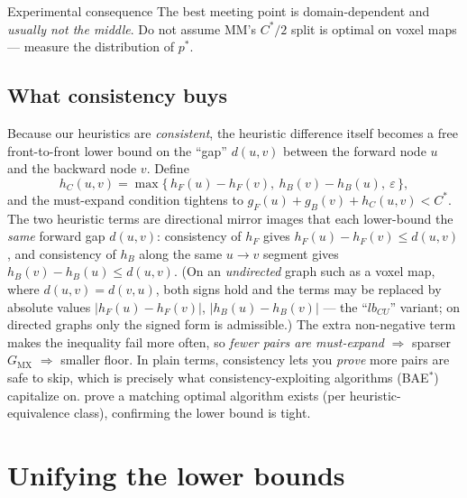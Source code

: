 \documentclass[11pt]{article}
\newcommand{\gF}{g_F}
\newcommand{\gB}{g_B}
\newcommand{\hF}{h_F}
\newcommand{\hB}{h_B}
\newcommand{\Cstar}{C^{*}}
\newcommand{\GMX}{G_{\mathrm{MX}}}
\begin{document}
\begin{keybox}{Experimental consequence}
The best meeting point is domain-dependent and \emph{usually not the middle}. Do not assume
MM's $\Cstar/2$ split is optimal on voxel maps --- measure the distribution of $p^{*}$.
\end{keybox}

\subsection{What consistency buys \citep{shaham2018consistent}}
\label{sec:consistency}
Because our heuristics are \emph{consistent}, the heuristic difference itself becomes a free
front-to-front lower bound on the ``gap'' $d(u,v)$ between the forward node $u$ and the
backward node $v$. Define
\begin{equation}
  h_C(u,v)=\max\bigl\{\,\hF(u)-\hF(v),\ \hB(v)-\hB(u),\ \varepsilon\,\bigr\},
  \label{eq:hc}
\end{equation}
and the must-expand condition tightens to $\gF(u)+\gB(v)+h_C(u,v)<\Cstar$. The two heuristic
terms are directional mirror images that each lower-bound the \emph{same} forward gap
$d(u,v)$: consistency of $\hF$ gives $\hF(u)-\hF(v)\le d(u,v)$, and consistency of $\hB$
along the same $u\to v$ segment gives $\hB(v)-\hB(u)\le d(u,v)$. (On an \emph{undirected}
graph such as a voxel map, where $d(u,v)=d(v,u)$, both signs hold and the terms may be
replaced by absolute values $|\hF(u)-\hF(v)|$, $|\hB(u)-\hB(v)|$ --- the ``$\mathit{lb}_{CU}$''
variant; on directed graphs only the signed form is admissible.) The extra non-negative term
makes the inequality fail more often, so \emph{fewer pairs are must-expand}
$\Rightarrow$ sparser $\GMX$ $\Rightarrow$ smaller floor. In plain terms, consistency lets
you \emph{prove} more pairs are safe to skip, which is precisely what consistency-exploiting
algorithms (BAE$^{*}$) capitalize on. \citet{shaham2018consistent}
prove a matching optimal algorithm exists (per heuristic-equivalence class), confirming the
lower bound is tight.

\section{Unifying the lower bounds \citep{siag2025bridging}}
\label{sec:bounds}
\end{document}
